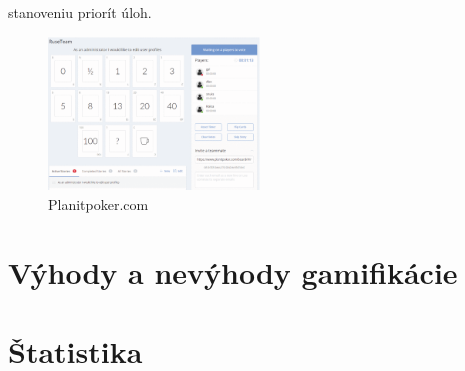 \documentclass[14pt,a4paper]{article}
\begin{document}
stanoveniu priorít úloh\cite{8757200}.
\begin{figure}[!h]
\centering
\includegraphics[width=0.5\textwidth]{planitpoker.png}
\caption{Planitpoker.com}
\label{fig:planitpoker}
\end{figure}

\section{Výhody a nevýhody gamifikácie}

\section{Štatistika}


\quad
\newpage



\end{document}
